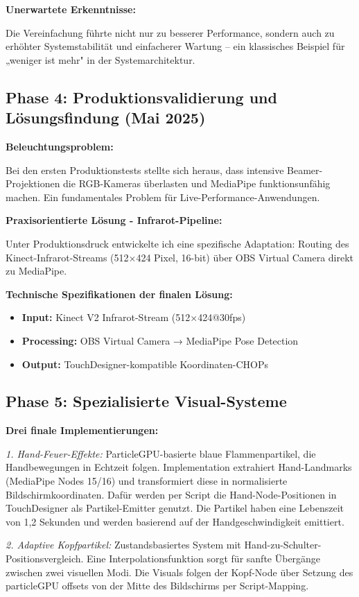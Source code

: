 \textbf{Unerwartete Erkenntnisse:}
\raggedright Die Vereinfachung führte nicht nur zu besserer Performance, sondern auch zu erhöhter Systemstabilität und einfacherer Wartung – ein klassisches Beispiel für „weniger ist mehr" in der Systemarchitektur.

\subsection{Phase 4: Produktionsvalidierung und Lösungsfindung (Mai 2025)}

\textbf{Beleuchtungsproblem:}
\raggedright Bei den ersten Produktionstests stellte sich heraus, dass intensive Beamer-Projektionen die RGB-Kameras überlasten und MediaPipe funktionsunfähig machen. Ein fundamentales Problem für Live-Performance-Anwendungen.

\textbf{Praxisorientierte Lösung - Infrarot-Pipeline:}
\raggedright Unter Produktionsdruck entwickelte ich eine spezifische Adaptation: Routing des Kinect-Infrarot-Streams (512×424 Pixel, 16-bit) über OBS Virtual Camera direkt zu MediaPipe.


\textbf{Technische Spezifikationen der finalen Lösung:}
\begin{itemize}
    \item \textbf{Input:} Kinect V2 Infrarot-Stream (512×424@30fps)
    \item \textbf{Processing:} OBS Virtual Camera → MediaPipe Pose Detection
    \item \textbf{Output:} TouchDesigner-kompatible Koordinaten-CHOPs
\end{itemize}

\subsection{Phase 5: Spezialisierte Visual-Systeme}

\textbf{Drei finale Implementierungen:}

\raggedright \textit{1. Hand-Feuer-Effekte:}
ParticleGPU-basierte blaue Flammenpartikel, die Handbewegungen in Echtzeit folgen. Implementation extrahiert Hand-Landmarks (MediaPipe Nodes 15/16) und transformiert diese in normalisierte Bildschirmkoordinaten.
Dafür werden per Script die Hand-Node-Positionen in TouchDesigner als Partikel-Emitter genutzt. Die Partikel haben eine Lebenszeit von 1,2 Sekunden und werden basierend auf der Handgeschwindigkeit emittiert.


\textit{2. Adaptive Kopfpartikel:}
Zustandsbasiertes System mit Hand-zu-Schulter-Positionsvergleich. Eine Interpolationsfunktion sorgt für sanfte Übergänge zwischen zwei visuellen Modi.
Die Visuals folgen der Kopf-Node über Setzung des particleGPU offsets von der Mitte des Bildschirms per Script-Mapping.

